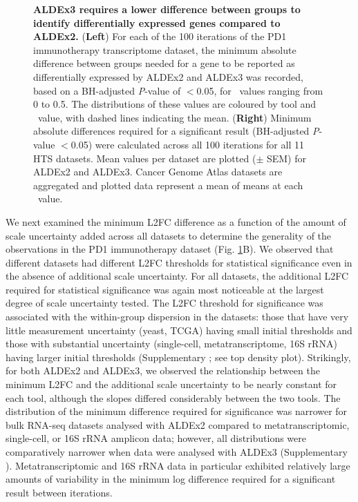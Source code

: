 \documentclass[10pt,letterpaper]{article}
\begin{document}
\begin{figure}[H]
    \centering
    \caption{\textbf{ALDEx3 requires a lower difference between groups to identify differentially expressed genes compared to ALDEx2.} (\textbf{Left}) For each of the 100 iterations of the PD1 immunotherapy transcriptome dataset, the minimum absolute difference between groups needed for a gene to be reported as differentially expressed by ALDEx2 and ALDEx3 was recorded, based on a BH-adjusted \textit{P}-value of $<$0.05, for \textgamma~values ranging from 0 to 0.5. The distributions of these values are coloured by tool and \textgamma~value, with dashed lines indicating the mean. (\textbf{Right}) Minimum absolute differences required for a significant result (BH-adjusted \textit{P}-value $<$0.05) were calculated across all 100 iterations for all 11 HTS datasets. Mean values per dataset are plotted ($\pm$ SEM) for ALDEx2 and ALDEx3. Cancer Genome Atlas datasets are aggregated and plotted data represent a mean of means at each \textgamma~value.}
    \label{fig:density}
\end{figure}

We next examined the minimum L2FC difference as a function of the amount of scale uncertainty added across all datasets to determine the generality of the observations in the PD1 immunotherapy dataset (Fig. \ref{fig:density}B). We observed that different datasets had different L2FC thresholds for statistical significance even in the absence of additional scale uncertainty. For all datasets, the additional L2FC required for statistical significance was again most noticeable at the largest degree of scale uncertainty tested. The L2FC threshold for significance was associated with the within-group dispersion in the datasets: those that have very little measurement uncertainty (yeast, TCGA) having small initial thresholds and those with substantial uncertainty (single-cell, metatranscriptome, 16S rRNA) having larger initial thresholds (Supplementary ; see top density plot). Strikingly, for both ALDEx2 and ALDEx3, we observed the relationship between the minimum L2FC and the additional scale uncertainty to be nearly constant for each tool, although the slopes differed considerably between the two tools. The distribution of the minimum difference required for significance was narrower for bulk RNA-seq datasets analysed with ALDEx2 compared to metatranscriptomic, single-cell, or 16S rRNA amplicon data; however, all distributions were comparatively narrower when data were analysed with ALDEx3 (Supplementary ). Metatranscriptomic and 16S rRNA data in particular exhibited relatively large amounts of variability in the minimum log difference required for a significant result between iterations. 
\end{document}
